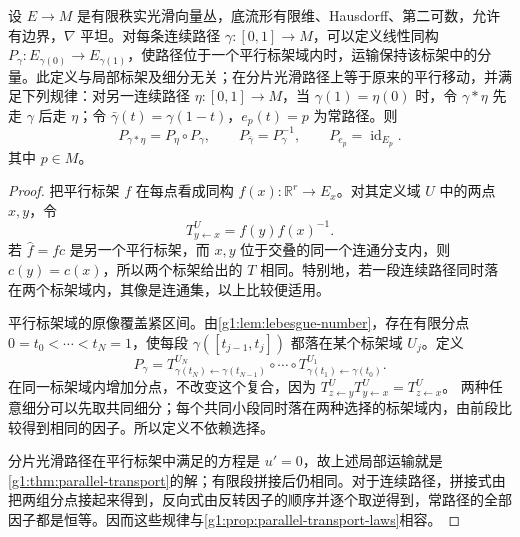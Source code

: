 \begin{lemma}
	\label{g1:lem:flat-continuous-transport}
	设 \(E\to M\) 是有限秩实光滑向量丛，底流形有限维、Hausdorff、第二可数，允许有边界，\(\nabla\) 平坦。对每条连续路径 \(\gamma:[0,1]\to M\)，可以定义线性同构 \(P_\gamma:E_{\gamma(0)}\to E_{\gamma(1)}\)，使路径位于一个平行标架域内时，运输保持该标架中的分量。此定义与局部标架及细分无关；在分片光滑路径上等于原来的平行移动，并满足下列规律：对另一连续路径 \(\eta:[0,1]\to M\)，当 \(\gamma(1)=\eta(0)\) 时，令 \(\gamma*\eta\) 先走 \(\gamma\) 后走 \(\eta\)；令 \(\bar\gamma(t)=\gamma(1-t)\)，\(e_p(t)=p\) 为常路径。则
	\[
		P_{\gamma*\eta}=P_\eta\circ P_\gamma,\qquad
		P_{\bar\gamma}=P_\gamma^{-1},\qquad
		P_{e_p}=\operatorname{id}_{E_p}.
	\]
	其中 \(p\in M\)。
\end{lemma}
\begin{proof}
	把平行标架 \(f\) 在每点看成同构 \(f(x):\mathbb R^r\to E_x\)。对其定义域 \(U\) 中的两点 \(x,y\)，令
	\[
		T^U_{y\leftarrow x}=f(y)f(x)^{-1}.
	\]
	若 \(\widehat f=fc\) 是另一个平行标架，而 \(x,y\) 位于交叠的同一个连通分支内，则 \(c(y)=c(x)\)，所以两个标架给出的 \(T\) 相同。特别地，若一段连续路径同时落在两个标架域内，其像是连通集，以上比较便适用。

	平行标架域的原像覆盖紧区间。由\cref{g1:lem:lebesgue-number}，存在有限分点 \(0=t_0<\cdots<t_N=1\)，使每段 \(\gamma([t_{j-1},t_j])\) 都落在某个标架域 \(U_j\)。定义
	\[
		P_\gamma
		=T^{U_N}_{\gamma(t_N)\leftarrow\gamma(t_{N-1})}\circ\cdots\circ
		T^{U_1}_{\gamma(t_1)\leftarrow\gamma(t_0)}.
	\]
	在同一标架域内增加分点，不改变这个复合，因为
	\(T^U_{z\leftarrow y}T^U_{y\leftarrow x}=T^U_{z\leftarrow x}\)。
	两种任意细分可以先取共同细分；每个共同小段同时落在两种选择的标架域内，由前段比较得到相同的因子。所以定义不依赖选择。

	分片光滑路径在平行标架中满足的方程是 \(u'=0\)，故上述局部运输就是\cref{g1:thm:parallel-transport}的解；有限段拼接后仍相同。对于连续路径，拼接式由把两组分点接起来得到，反向式由反转因子的顺序并逐个取逆得到，常路径的全部因子都是恒等。因而这些规律与\cref{g1:prop:parallel-transport-laws}相容。
\end{proof}

